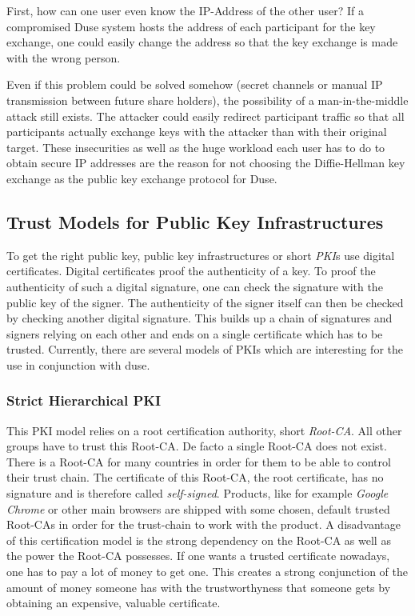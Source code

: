 First, how can one user even know the IP-Address of the other user? If a compromised
Duse system hosts the address of each participant for the key exchange, one could
easily change the address so that the key exchange is made with the wrong person.

Even if this problem could be solved somehow (secret channels or manual IP transmission
between future share holders), the possibility of a man-in-the-middle attack still
exists. The attacker could easily redirect participant traffic so that all participants
actually exchange keys with the attacker than with their original target.
These insecurities as well as the huge workload each user has to do to obtain
secure IP addresses are the reason for not choosing the Diffie-Hellman key exchange
as the public key exchange protocol for Duse.

\subsection{Trust Models for Public Key Infrastructures}

To get the right public key, public key infrastructures or short \textit{PKI}s use
digital certificates. Digital certificates proof the authenticity of a key. To proof
the authenticity of such a digital signature, one can check the signature with the
public key of the signer. The authenticity of the signer itself can then be checked
by checking another digital signature. This builds up a chain of signatures and 
signers relying on each other and ends on a single certificate which has to be trusted.
Currently, there are several models of PKIs which are interesting for the use
in conjunction with duse.

\subsubsection{Strict Hierarchical PKI}

This PKI model relies on a root certification authority, short \textit{Root-CA}.
All other groups have to trust this Root-CA.
De facto a single Root-CA does not exist. There is a Root-CA for many countries
in order for them to be able to control their trust chain.
The certificate of this Root-CA, the
root certificate, has no signature and is therefore called \textit{self-signed}.
Products, like for example \textit{Google Chrome} or other main browsers are
shipped with some chosen, default trusted Root-CAs in order for the trust-chain
to work with the product. A disadvantage of this certification model is the
strong dependency on the Root-CA as well as the power the Root-CA possesses.
If one wants a trusted certificate nowadays, one has to pay a lot of money to
get one. This creates a strong conjunction of the amount of money someone has with
the trustworthyness that someone gets by obtaining an expensive, valuable certificate.

